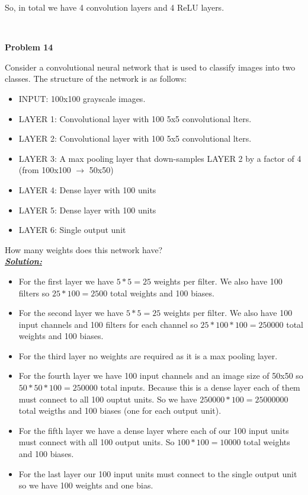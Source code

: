 \documentclass{article}
\begin{document}
\begin{enumerate} [label=\Alph*]
           So, in total we have 4 convolution layers and 4 ReLU layers.

             


          

          
\end{enumerate}\

\newpage
\noindent \textbf{Problem 14}

\noindent Consider a convolutional neural network that is used to classify images into two classes.
The structure of the network is as follows:

\begin{itemize}
    \item INPUT: 100x100 grayscale images.
    \item LAYER 1: Convolutional layer with 100 5x5 convolutional lters.
    \item LAYER 2: Convolutional layer with 100 5x5 convolutional lters.
    \item LAYER 3: A max pooling layer that down-samples LAYER 2 by a factor of 4 (from 100x100 $\rightarrow$ 50x50)
    \item LAYER 4: Dense layer with 100 units
    \item LAYER 5: Dense layer with 100 units
    \item LAYER 6: Single output unit
\end{itemize}

\noindent How many weights does this network have? \\

\noindent \underline{\textbf{\textit{Solution:}}} 

\begin{itemize}
  \item For the first layer we have $5*5 = 25$ weights per filter. We also have 100 filters so $25*100=2500$ total weights and 100 biases.
  \item For the second layer we have $5*5=25$ weights per filter. We also have 100 input channels and 100 filters for each channel so $25*100*100=250000$ total weights and 100 biases.
  \item For the third layer no weights are required as it is a max pooling layer.
  \item For the fourth layer we have 100 input channels and an image size of 50x50 so $50*50*100=250000$ total inputs.
        Because this is a dense layer each of them must connect to all 100 ouptut units. So we have $250000*100=25000000$ total weigths and 100 biases (one for each output unit).
  \item For the fifth layer we have a dense layer where each of our 100 input units must connect with all 100 output units. So $100*100=10000$ total weights and 100 biases.
  \item For the last layer our 100 input units must connect to the single output unit so we have 100 weights and one bias. 
\end{itemize}
\end{document}
